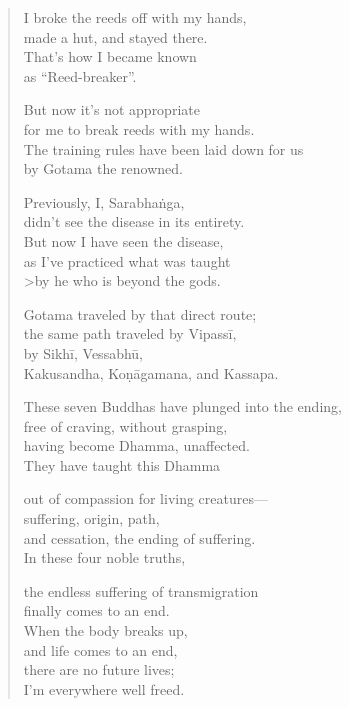 \documentclass[12pt,openany]{book}%
\begin{document}
\begin{verse}%
I broke the reeds off with my hands, \\
made a hut, and stayed there. \\
That’s how I became known \\
as “Reed-breaker”. 

But now it’s not appropriate \\
for me to break reeds with my hands. \\
The training rules have been laid down for us \\
by Gotama the renowned. 

Previously, I, \textsanskrit{Sarabhaṅga}, \\
didn’t see the disease in its entirety. \\
But now I have seen the disease, \\
as I’ve practiced what was taught \\>by he who is beyond the gods. 

Gotama traveled by that direct route; \\
the same path traveled by \textsanskrit{Vipassī}, \\
by \textsanskrit{Sikhī}, \textsanskrit{Vessabhū}, \\
Kakusandha, \textsanskrit{Koṇāgamana}, and Kassapa. 

These seven Buddhas have plunged into the ending, \\
free of craving, without grasping, \\
having become Dhamma, unaffected. \\
They have taught this Dhamma 

out of compassion for living creatures—\\
suffering, origin, path, \\
and cessation, the ending of suffering. \\
In these four noble truths, 

the endless suffering of transmigration \\
finally comes to an end. \\
When the body breaks up, \\
and life comes to an end, \\
there are no future lives; \\
I’m everywhere well freed. 

%
\end{verse}
\end{document}
